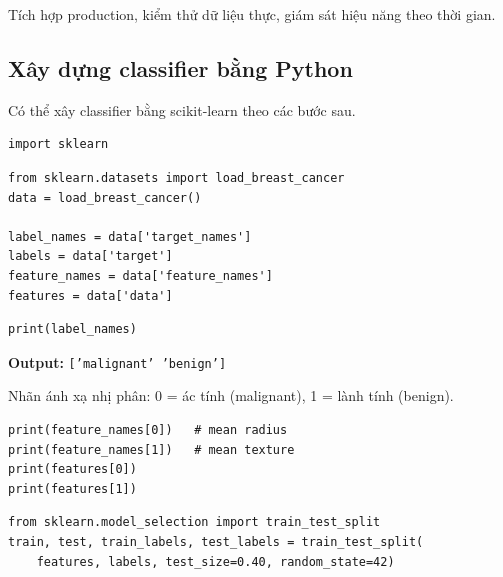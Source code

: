 \begin{phuongphap}[title={Bước 7: Triển khai}]
Tích hợp production, kiểm thử dữ liệu thực, giám sát hiệu năng theo thời gian.
\end{phuongphap}

\subsection{Xây dựng classifier bằng Python}

\begin{phuongphap}[title={Scikit-learn}]
Có thể xây classifier bằng scikit-learn theo các bước sau.
\end{phuongphap}

\begin{vidu}[title={Bước 1: Import}]
\begin{lstlisting}
import sklearn
\end{lstlisting}
\end{vidu}

\begin{vidu}[title={Bước 2: Dataset Breast Cancer Wisconsin}]
\begin{lstlisting}
from sklearn.datasets import load_breast_cancer
data = load_breast_cancer()

label_names = data['target_names']
labels = data['target']
feature_names = data['feature_names']
features = data['data']
\end{lstlisting}

\begin{lstlisting}
print(label_names)
\end{lstlisting}
\textbf{Output:} \texttt{['malignant' 'benign']}

Nhãn ánh xạ nhị phân: 0 = ác tính (malignant), 1 = lành tính (benign).

\begin{lstlisting}
print(feature_names[0])   # mean radius
print(feature_names[1])   # mean texture
print(features[0])
print(features[1])
\end{lstlisting}
\end{vidu}

\begin{vidu}[title={Bước 3: Chia train/test (60/40)}]
\begin{lstlisting}
from sklearn.model_selection import train_test_split
train, test, train_labels, test_labels = train_test_split(
    features, labels, test_size=0.40, random_state=42)
\end{lstlisting}
\end{vidu}

